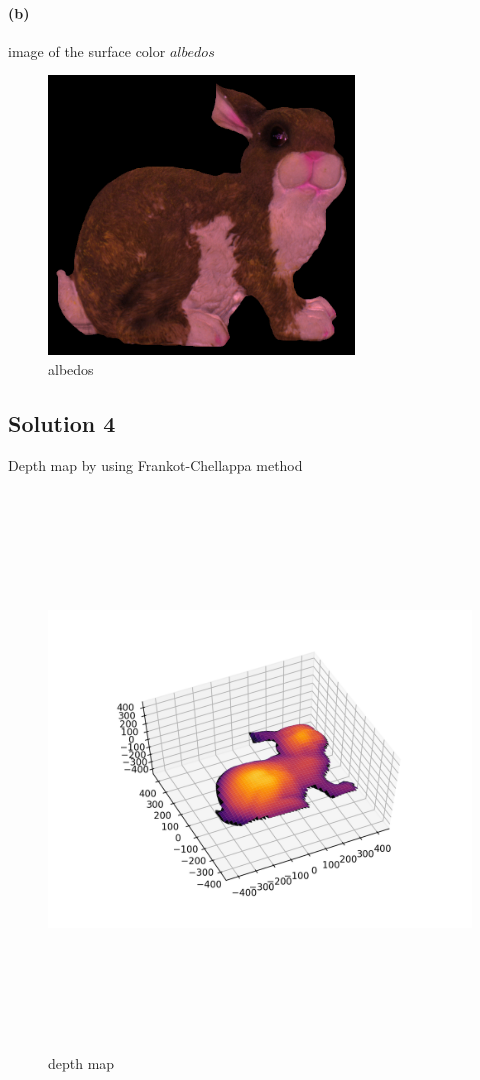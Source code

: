 \documentclass{article}
\newcommand{\solution}[1]{\clearpage \subsection*{Solution #1}}  %
\newcommand{\spart}[1]{\paragraph{(#1)}}
\begin{document}
\spart{b}
image of the surface color $albedos$
\begin{figure}[h!]
  \centering
  	\includegraphics[height=20em]{code/outputs/prob3_alb.png}
	  \caption{albedos}
\end{figure}

\solution{4}
Depth map by using Frankot-Chellappa method
\begin{figure}[h!]
  \centering
  	\includegraphics[height=40em]{code/outputs/prob4-1.png}
	  \caption{depth map}
\end{figure}
\end{document}
